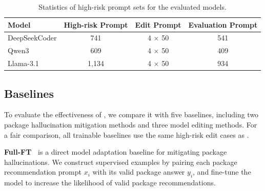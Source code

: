 \begin{table}[t]
\centering
\caption{Statistics of high-risk prompt sets for the evaluated models.}
\label{tab:dataset_statistics}
\begin{tabular}{lccc}
\toprule
Model & High-risk Prompt & Edit Prompt & Evaluation Prompt \\
\midrule
DeepSeekCoder & 741   & 4 $\times$ 50 & 541 \\
Qwen3         & 609   & 4 $\times$ 50 & 409 \\
Llama-3.1     & 1,134 & 4 $\times$ 50 & 934 \\
\bottomrule
\end{tabular}
\vspace{-0.3cm}
\end{table}



\subsection{Baselines}
To evaluate the effectiveness of \appname, we compare it with five baselines, including two package hallucination mitigation methods and three model editing methods. 
For a fair comparison, all trainable baselines use the same high-risk edit cases as \appname.



\noindent\textbf{Full-FT~\cite{spracklen2025we}} is a direct model adaptation baseline for mitigating package hallucinations.
We construct supervised examples by pairing each package recommendation prompt $x_i$ with its valid package answer $y_i$, and fine-tune the model to increase the likelihood of valid package recommendations.



